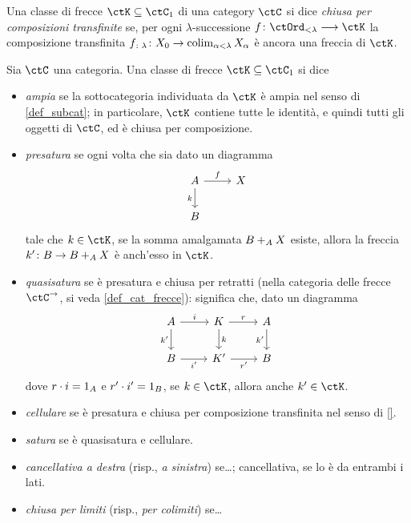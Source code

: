 \begin{definition}
 Una classe di frecce \(\ctK\subseteq\ctC_1\) di una category \(\ctC\) si dice \emph{chiusa per composizioni transfinite} se, per ogni \(\lambda\)-successione \(f \colon \ctOrd_{<\lambda}\fun\ctK\) la composizione transfinita \(f_{\colon\lambda} \colon X_0\to \colim_{\alpha < \lambda} X_\alpha\) è ancora una freccia di \(\ctK\).
\end{definition}
\begin{definition}
 Sia \(\ctC\) una categoria. Una classe di frecce \(\ctK\subseteq\ctC_1\) si dice
 \begin{itemize}
  \item \emph{ampia} se la sottocategoria individuata da \(\ctK\) è ampia nel senso di \ref{def_subcat}; in particolare, \(\ctK\) contiene tutte le identità, e quindi tutti gli oggetti di \(\ctC\), ed è chiusa per composizione.
  \item \emph{presatura} se ogni volta che sia dato un diagramma
        \[
         \begin{tikzcd}
          A \ar[d, "k"']\ar[r, "f"]& X \\
          B &
         \end{tikzcd}
        \]
        tale che \(k\in\ctK\), se la somma amalgamata \(\push BXA\) esiste, allora la freccia \(k' \colon B\to \push BXA\) è anch'esso in \(\ctK\).
  \item \emph{quasisatura} se è presatura e chiusa per retratti (nella categoria delle frecce \(\ctC^\to\), si veda \ref{def_cat_frecce}): significa che, dato un diagramma
        \[
         \begin{tikzcd}
          A \ar[r, "i"]\ar[d, "k'"'] & K \ar[r, "r"]\ar[d, "k"]& A \ar[d, "k'"']\\
          B \ar[r, "i'"'] & K' \ar[r, "r'"'] & B
         \end{tikzcd}
        \]
        dove \(r\cmp i = 1_A\) e \(r'\cmp i' = 1_B\), se \(k\in \ctK\), allora anche \(k'\in\ctK\).
  \item \emph{cellulare} se è presatura e chiusa per composizione transfinita nel senso di \ref{}.
  \item \emph{satura} se è quasisatura e cellulare.
  \item \emph{cancellativa a destra} (risp., \emph{a sinistra}) se\dots; cancellativa, se lo è da entrambi i lati.
  \item \emph{chiusa per limiti} (risp., \emph{per colimiti}) se\dots
 \end{itemize}
\end{definition}
